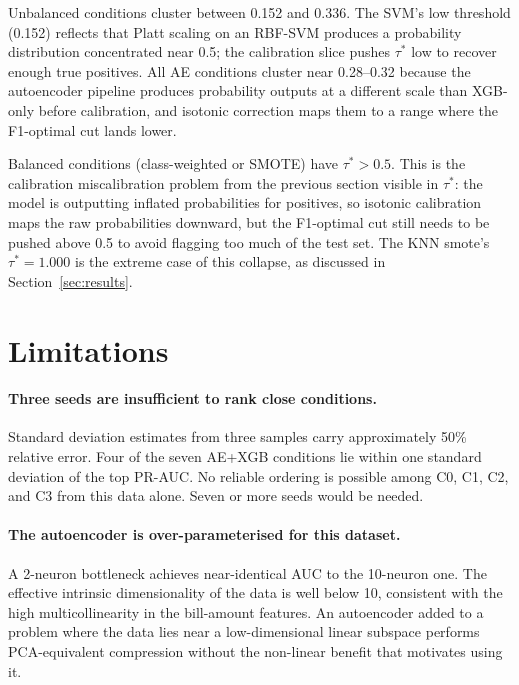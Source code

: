 \documentclass[12pt,a4paper]{article}
\begin{document}
Unbalanced conditions cluster between 0.152 and 0.336. The SVM's low
threshold (0.152) reflects that Platt scaling on an RBF-SVM produces a
probability distribution concentrated near 0.5; the calibration slice pushes
$\tau^*$ low to recover enough true positives. All AE conditions cluster
near 0.28--0.32 because the autoencoder pipeline produces probability outputs
at a different scale than XGB-only before calibration, and isotonic correction
maps them to a range where the F1-optimal cut lands lower.

Balanced conditions (class-weighted or SMOTE) have $\tau^* > 0.5$. This is
the calibration miscalibration problem from the previous section visible
in $\tau^*$: the model is outputting inflated probabilities for positives,
so isotonic calibration maps the raw probabilities downward, but the
F1-optimal cut still needs to be pushed above 0.5 to avoid flagging too
much of the test set. The KNN smote's $\tau^* = 1.000$ is the extreme case
of this collapse, as discussed in Section~\ref{sec:results}.

\section{Limitations}

\paragraph{Three seeds are insufficient to rank close conditions.}
Standard deviation estimates from three samples carry approximately 50\%
relative error. Four of the seven AE+XGB conditions lie within one standard
deviation of the top PR-AUC. No reliable ordering is possible among C0, C1,
C2, and C3 from this data alone. Seven or more seeds would be needed.

\paragraph{The autoencoder is over-parameterised for this dataset.}
A 2-neuron bottleneck achieves near-identical AUC to the 10-neuron one.
The effective intrinsic dimensionality of the data is well below 10, consistent
with the high multicollinearity in the bill-amount features. An autoencoder
added to a problem where the data lies near a low-dimensional linear subspace
performs PCA-equivalent compression without the non-linear benefit that
motivates using it.
\end{document}
